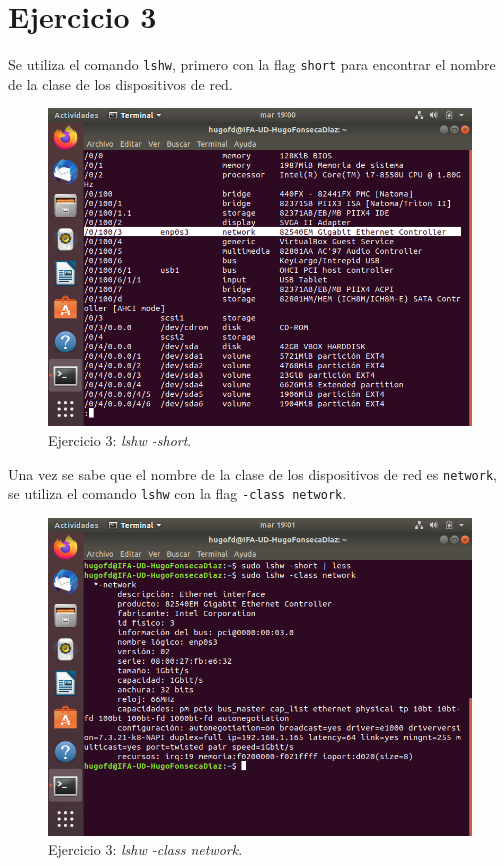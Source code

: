 \documentclass[11pt]{article}
\begin{document}
\section{Ejercicio 3}
Se utiliza el comando \verb|lshw|, primero con la flag \verb|short| para encontrar el nombre de la clase de los dispositivos de red.

\begin{figure}[H]
    \caption{Ejercicio 3: \textit{lshw -short}.}
  \centering
  \includegraphics[scale=0.7]{e3-1.png}
\end{figure}

Una vez se sabe que el nombre de la clase de los dispositivos de red es \verb|network|, se utiliza el comando \verb|lshw| con la flag \verb|-class network|.

\begin{figure}[H]
    \caption{Ejercicio 3: \textit{lshw -class network}.}
  \centering
  \includegraphics[scale=0.7]{e3-2.png}
\end{figure}
\end{document}
